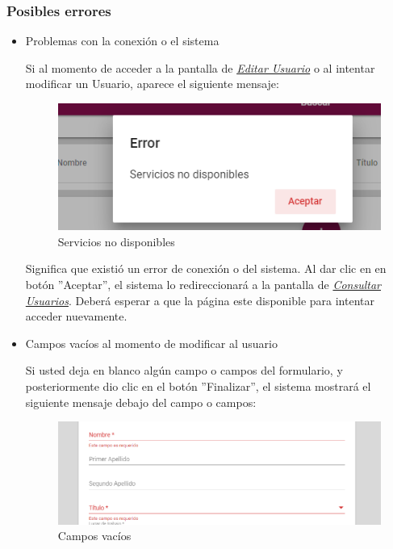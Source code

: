                 \subsubsection{Posibles errores}
                    \begin{itemize}
                        \item Problemas con la conexión o el sistema

                            Si al momento de acceder a la pantalla de \hyperlink{editarUs}{\textit{Editar Usuario}} o al intentar modificar un Usuario, aparece el siguiente mensaje:
                            \clearpage
                            \begin{figure}[!hbtp]
                            	\centering
                            	\includegraphics[width=0.4\linewidth]{images/SP5/MSGSN}
                            	\caption{Servicios no disponibles}

                            \end{figure}


                            Significa que existió un error de conexión o del sistema. Al dar clic en en botón ''Aceptar'', el sistema lo redireccionará  a la pantalla de \hyperlink{consultarUs}{\textit{Consultar Usuarios}}. Deberá esperar a que la página este disponible para intentar acceder nuevamente.

                        \item Campos vacíos al momento de modificar al usuario

                            Si usted deja en blanco algún campo o campos del formulario, y posteriormente dio clic en el botón ''Finalizar'', el sistema mostrará el siguiente mensaje debajo del campo o campos:

                          \begin{figure}[!hbtp]
                         	\centering
                         	\includegraphics[width=0.4\linewidth]{images/SP5/MSG44}
                         	\caption{Campos vacíos}
                         	\label{mensaje44}


\end{figure}
\end{itemize}
